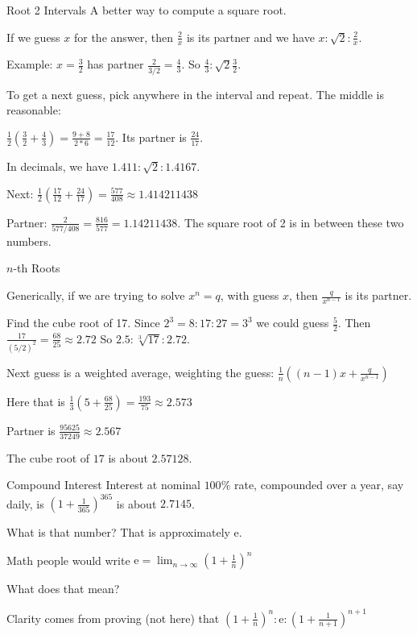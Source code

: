 \documentclass{beamer}
\begin{document}
\begin{frame}{Root 2 Intervals}
    A better way to compute a square root.

    If we guess $x$ for the answer, then $\frac{2}{x}$ is its partner and we have $x : \sqrt{2} : \frac{2}{x}$.  

    Example: $x=\frac{3}{2}$ has partner $\frac{2}{3/2} = \frac{4}{3}$. So $\frac{4}{3} : \sqrt{2} \frac{3}{2}$.

    To get a next guess, pick anywhere in the interval and repeat. The middle is reasonable: 

    $\frac{1}{2} (\frac{3}{2} + \frac{4}{3}) =  \frac{9 + 8}{2*6} = \frac{17}{12}$. Its partner is $\frac{24}{17}$.  

    In decimals, we have $1.411 : \sqrt{2} : 1.4167$. 

    Next:  $\frac{1}{2} (\frac{17}{12} + \frac{24}{17} ) =  \frac{577}{408} \approx 1.414211438$

    Partner:  $\frac{2}{577/408} = \frac{816}{577} = 1.14211438$. The square root of 2 is in between these two numbers. 
    
\end{frame}

\begin{frame}{$n$-th Roots}

    Generically,  if we are trying to solve $x^n = q$, with guess $x$, then $\frac{q}{x^{n-1}}$ is its partner. 

    Find the cube root of 17. Since $2^3 = 8 : 17 : 27=3^3$ we could guess $\frac{5}{2}$. Then $\frac{17}{ (5/2)^2 }  = \frac{68}{25} \approx 2.72$  So $2.5:\sqrt[3]{17}:2.72$.

    Next guess is a weighted average, weighting the guess: $\frac{1}{n} ((n-1) x + \frac{q}{x^{n-1}})$

    Here that is $\frac{1}{3} ( 5 + \frac{68}{25}) = \frac{193}{75} \approx 2.573$

    Partner is $\frac{95625}{37249} \approx 2.567$

    The cube root of $17$ is about $2.57128$. 
\end{frame}


\begin{frame}{Compound Interest}
    Interest at nominal $100\%$ rate, compounded over a year, say daily, is $(1+\frac{1}{365})^{365}$ is about $2.7145$.

    What is that number?  That is approximately $\mathrm{e}$. 

    Math people would write $\mathrm{e} = \lim_{n \to \infty} (1+\frac{1}{n})^n$

    What does that mean? 

    Clarity comes from proving (not here) that $(1+\frac{1}{n})^n : \mathrm{e} : (1+\frac{1}{n+1})^{n+1}$
    
\end{frame}
\end{document}
